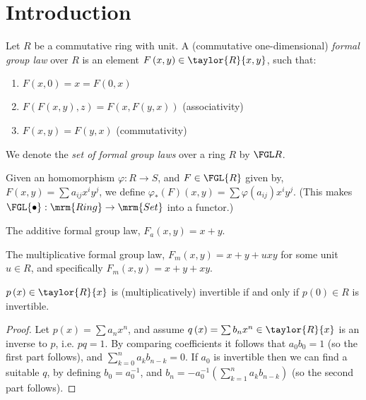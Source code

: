 \section{Introduction}

\begin{definition*}
	Let $R$ be a commutative ring with unit.
	A (commutative one-dimensional) \emph{formal group law} over $R$ is an element $F\left(x,y\right) \in \taylor{R}{x,y}$, such that:
	\begin{enumerate}
		\item $F\left(x,0\right) = x = F\left(0,x\right)$
		\item $F\left(F\left(x,y\right),z\right)=F\left(x,F\left(y,x\right)\right)$ (associativity)
		\item $F\left(x,y\right)=F\left(y,x\right)$ (commutativity)
	\end{enumerate}
	We denote the \emph{set of formal group laws} over a ring $R$ by $\FGL R$.
\end{definition*}

\begin{definition*}
	Given an homomorphism $\varphi: R \to S$, and $F \in \FGL{R}$
	given by, $F\left(x,y\right) = \sum a_{ij} x^i y^j$,
	we define
	$
		\varphi_*\left(F\right)\left(x,y\right)
		=
		\sum \varphi\left(a_{ij}\right) x^i y^j
	$.
	(This makes $\FGL{\bullet}: \mrm{Ring} \to \mrm{Set}$ into a functor.)
\end{definition*}

\begin{example*}
	The additive formal group law, $F_a\left(x,y\right) = x+y$.
\end{example*}

\begin{example*}
	The multiplicative formal group law, $F_m\left(x,y\right) = x+y+uxy$ for some unit $u\in R$, and specifically $F_m\left(x,y\right) = x+y+xy$.
\end{example*}

\begin{lemma*}
	$p\left(x\right) \in \taylor{R}{x}$ is (multiplicatively) invertible if and only if $p\left(0\right) \in R$ is invertible.
\end{lemma*}
\begin{proof}
	Let $p\left(x\right) = \sum a_n x^n$, and assume $q\left(x\right) = \sum b_n x^n \in \taylor{R}{x}$ is an inverse to $p$, i.e. $pq = 1$. 
	By comparing coefficients it follows that $a_0 b_0 = 1$ (so the first part follows), and $\sum_{k=0}^n a_k b_{n-k} = 0$.
	If $a_0$ is invertible then we can find a suitable $q$, by defining $b_0 = a_0^{-1}$, and $b_n = - a_0^{-1} \left(\sum_{k=1}^n a_k b_{n-k}\right)$ (so the second part follows).
\end{proof}


